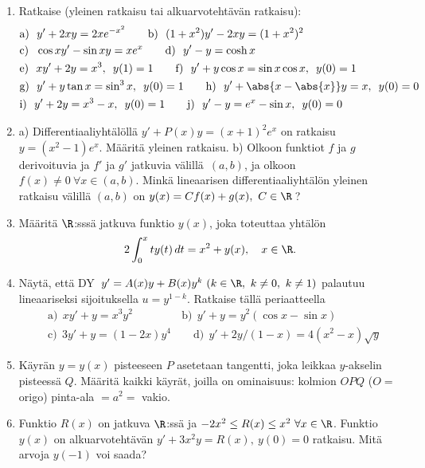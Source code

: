 \Harj
\begin{enumerate}

\item 
Ratkaise (yleinen ratkaisu tai alkuarvotehtävän ratkaisu):
\begin{align*}
&\text{a)}\ \ y'+2xy=2xe^{-x^2} \qquad
 \text{b)}\ \ (1+x^2)y'-2xy=(1+x^2)^2 \\
&\text{c)}\ \ \cos x y'-\sin x y=xe^x \qquad
 \text{d)}\ \ y'-y=\cosh x \\
&\text{e)}\ \ xy'+2y=x^3,\,\ y(1)=1 \qquad
 \text{f)}\ \ y'+y\cos x=\sin x\cos x,\,\ y(0)=1 \\
&\text{g)}\ \ y'+y\tan x=\sin^3 x,\,\ y(0)=1 \qquad
 \text{h)}\ \ y'+\abs{x-\abs{x}}y=x,\,\ y(0)=0 \\
&\text{i)}\ \ y'+2y=x^3-x,\,\ y(0)=1 \qquad
 \text{j)}\ \ y'-y=e^x-\sin x,\,\ y(0)=0
\end{align*}

\item 
a) Differentiaaliyhtälöllä $y'+P(x)y=(x+1)^2e^x$ on ratkaisu $y=(x^2-1)e^x$. Määritä yleinen
ratkaisu. \newline
b) Olkoon funktiot $f$ ja $g$ derivoituvia ja $f'$ ja $g'$ jatkuvia välillä $(a,b)$,
ja olkoon $f(x) \neq 0\ \forall x\in(a,b)$. Minkä lineaarisen differentiaaliyhtälön yleinen
ratkaisu välillä $(a,b)$ on $y(x)=Cf(x)+g(x),\ C\in\R\,$?

\item
Määritä $\R$:sssä jatkuva funktio $y(x)$, joka toteuttaa yhtälön
\[
2\int_0^x ty(t)\,dt=x^2+y(x), \quad x\in\R.
\]

\item \label{H-dy-4: Bernoullin DY}
 
Näytä, että  DY $\,y'=A(x)y+B(x)y^k\ (k\in\R,\ k \neq 0,\ k \neq 1)$ palautuu 
lineaariseksi sijoituksella $u=y^{1-k}$. Ratkaise tällä periaatteella
\begin{align*}
&\text{a)}\ \ xy'+y=x^3y^2 \qquad\qquad\,\
 \text{b)}\ \ y'+y=y^2(\cos x-\sin x) \\
&\text{c)}\ \ 3y'+y=(1-2x)y^4 \qquad
 \text{d)}\ \ y'+2y/(1-x)=4(x^2-x)\sqrt{y}
\end{align*}

\item
Käyrän $y=y(x)$ pisteeseen $P$ asetetaan tangentti, joka leikkaa $y$-akselin pisteessä $Q$.
Määritä kaikki käyrät, joilla on ominaisuus: kolmion $OPQ$ ($O=$ origo) pinta-ala $=a^2=$ vakio.

\item
Funktio $R(x)$ on jatkuva $\R$:ssä ja $-2x^2 \le R(x) \le x^2\ \forall x\in\R$. Funktio $y(x)$
on alkuarvotehtävän $y'+3x^2y=R(x),\ y(0)=0$ ratkaisu. Mitä arvoja $y(-1)$ voi saada?


\end{enumerate}
